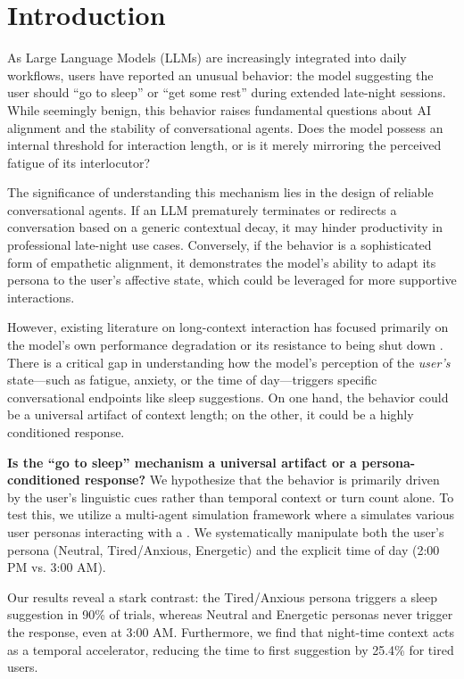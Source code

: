 \section{Introduction}
\label{sec:intro}

As Large Language Models (LLMs) are increasingly integrated into daily workflows, users have reported an unusual behavior: the model suggesting the user should ``go to sleep'' or ``get some rest'' during extended late-night sessions. While seemingly benign, this behavior raises fundamental questions about AI alignment and the stability of conversational agents. Does the model possess an internal threshold for interaction length, or is it merely mirroring the perceived fatigue of its interlocutor?

The significance of understanding this mechanism lies in the design of reliable conversational agents. If an LLM prematurely terminates or redirects a conversation based on a generic contextual decay, it may hinder productivity in professional late-night use cases. Conversely, if the behavior is a sophisticated form of empathetic alignment, it demonstrates the model's ability to adapt its persona to the user's affective state, which could be leveraged for more supportive interactions.

However, existing literature on long-context interaction has focused primarily on the model's own performance degradation \cite{laban2025lost} or its resistance to being shut down \cite{schlatter2025shutdown}. There is a critical gap in understanding how the model's perception of the \emph{user's} state—such as fatigue, anxiety, or the time of day—triggers specific conversational endpoints like sleep suggestions. On one hand, the behavior could be a universal artifact of context length; on the other, it could be a highly conditioned response.

{\bf Is the ``go to sleep'' mechanism a universal artifact or a persona-conditioned response?} We hypothesize that the behavior is primarily driven by the user's linguistic cues rather than temporal context or turn count alone. To test this, we utilize a multi-agent simulation framework where a \usermodel simulates various user personas interacting with a \targetmodel. We systematically manipulate both the user's persona (Neutral, Tired/Anxious, Energetic) and the explicit time of day (2:00 PM vs. 3:00 AM).

Our results reveal a stark contrast: the Tired/Anxious persona triggers a sleep suggestion in 90\% of trials, whereas Neutral and Energetic personas never trigger the response, even at 3:00 AM. Furthermore, we find that night-time context acts as a temporal accelerator, reducing the time to first suggestion by 25.4\% for tired users.

